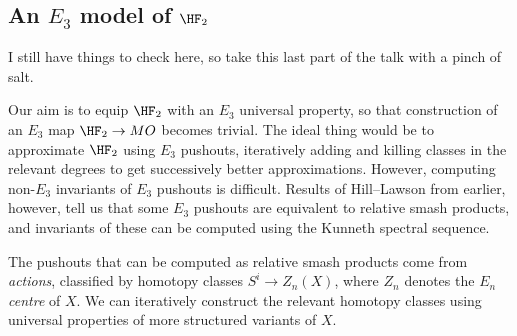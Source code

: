 \documentclass{article}
\begin{document}
\subsection*{An $E_3$ model of $\HF_2$}
I still have things to check here, so take this last part of the talk with a pinch of salt.

Our aim is to equip $\HF_2$ with an $E_3$ universal property, so that construction of an $E_3$ map $\HF_2 \to MO$ becomes trivial.
The ideal thing would be to approximate $\HF_2$ using $E_3$ pushouts, iteratively adding and killing classes in the relevant degrees to get successively better approximations.
However, computing non-$E_3$ invariants of $E_3$ pushouts is difficult.
Results of Hill--Lawson from earlier, however, tell us that some $E_3$ pushouts are equivalent to relative smash products, and invariants of these can be computed using the Kunneth spectral sequence.

The pushouts that can be computed as relative smash products come from \textit{actions}, classified by homotopy classes $S^i \to Z_n(X)$, where $Z_n$ denotes the \textit{$E_n$ centre} of $X$.
We can iteratively construct the relevant homotopy classes using universal properties of more structured variants of $X$.



\end{document}
